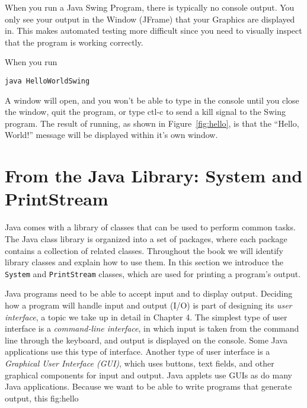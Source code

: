 When you run a  Java Swing Program, there is typically no console
output. You only see your output in the Window (JFrame) that your
Graphics are displayed in. This makes automated testing more difficult
since you need to visually inspect that the program is working correctly.

When you run

\begin{jjjlisting}
\begin{lstlisting}
java HelloWorldSwing
\end{lstlisting}
\end{jjjlisting}

\noindent A window will open, and you won't be able to type in the
console until you close the window, quit the program, or type ctl-c to
send a kill signal to the Swing program. The
result of running, as shown in Figure~\ref{fig:hello}, is that the ``Hello, World!'' message
will be displayed within it's own window.

\vspace*{2pc}
\section{From the Java Library: System and \\PrintStream}
\label{sec:systemclass}
\WWWjava 
Java comes with a library of classes that can be used to perform
common tasks. The Java class library is organized into a set
of packages, where each package contains a collection of related
classes.  Throughout the book we will identify library classes and
explain how to use them. In this section we introduce the {\tt System}
and {\tt PrintStream} classes, which are used for printing a program's
output.

Java programs need to be able to accept input and to display output.
Deciding how a program will handle input and output (I/O) is part of
designing its {\em user interface}, a topic we take up in detail in
Chapter 4. The simplest type of user interface is a {\it command-line
interface}, in which input is taken from the command line through the
keyboard, and output is displayed on the console.  Some Java
applications use this type of interface. Another type of user
interface is a {\it Graphical User Interface (GUI)}, which uses
buttons, text fields, and other graphical components for input and
output. Java applets use GUIs as do many Java applications.  Because
we want to be able to write programs that generate output, this
{fig:hello}

